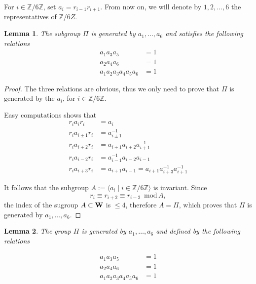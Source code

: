 \documentclass[10pt,a4paper]{amsart}
\newcommand{\Z}{\mathbb{Z}}
\renewcommand{\mod}{\,\mathrm{mod}\,}
\newtheorem{lemma}{Lemma}
\begin{document}
For $i\in\Z/6\Z$, set $a_i=r_{i-1}r_{i+1}$. From now on, we will denote by
$1, 2,\ldots, 6$ the  representatives of $\Z/6Z$.




\begin{lemma}
 The subgroup $\Pi$ is generated by $a_1,\ldots, a_6$
 and satisfies the following relations
 \begin{align*}
 a_1 a_3 a_5&=1\\
 a_2 a_4 a_6&=1 \\
 a_1 a_2 a_3 a_4 a_5 a_6&=1 
 \end{align*}
\end{lemma}

\begin{proof}
The three relations are obvious, thus we only need to prove that
$\Pi$ is generated by the 
$a_i$, for $i\in\Z/6\Z$. 

Easy computations shows that 
\begin{align*}
r_ia_i r_i&=a_i\\
r_ia_{i\pm1}r_i&=a_{i\pm1}^{-1}\\
r_ia_{i+2}r_i&=a_{i+1}a_{i+2}a_{i+1}^{-1}\\
r_ia_{i-2}r_i&=a_{i-1}^{-1}a_{i-2}a_{i-1}\\
r_ia_{i+3}r_i&=a_{i+1}a_{i-1}=a_{i+1}a_{i+3}^{-1}a_{i+1}^{-1}
\end{align*}

It follows that the subgroup 
$A:=\langle a_i\mid i\in\Z/6\Z\rangle$ is invariant.
Since 
$$r_i\equiv r_{i+2}\equiv r_{i-2}\,\,\mod A,$$ 
the index of the sugroup $A\subset{\bf W}$ is $\leq 4$, therefore
$A=\Pi$, which proves that
$\Pi$ is generated by $a_1,\ldots, a_6$.
\end{proof}

\begin{lemma}\label{relations} The group $\Pi$ is generated by $a_1,\ldots, a_6$
and defined by the following relations

 \begin{align}
 a_1 a_3 a_5&=1 \label{free1}\\
 a_2 a_4 a_6&=1 \label{free2}\\
 a_1 a_2 a_3 a_4 a_5 a_6&=1 \label{relation}
 \end{align}
\end{lemma}
\end{document}
